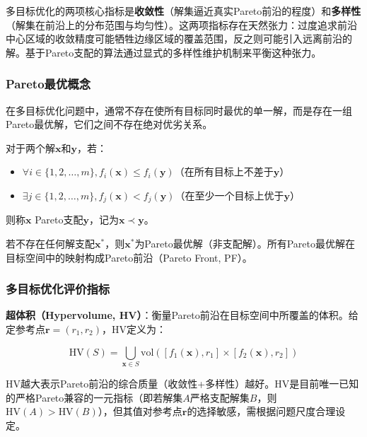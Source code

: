 多目标优化的两项核心指标是\textbf{收敛性}（解集逼近真实Pareto前沿的程度）和\textbf{多样性}（解集在前沿上的分布范围与均匀性）。这两项指标存在天然张力：过度追求前沿中心区域的收敛精度可能牺牲边缘区域的覆盖范围，反之则可能引入远离前沿的解。基于Pareto支配的算法通过显式的多样性维护机制来平衡这种张力。

\subsubsection{Pareto最优概念}

在多目标优化问题中，通常不存在使所有目标同时最优的单一解，而是存在一组Pareto最优解，它们之间不存在绝对优劣关系。

\begin{definition}[Pareto支配]
对于两个解$\mathbf{x}$和$\mathbf{y}$，若：
\begin{itemize}
    \item $\forall i \in \{1,2,\ldots,m\}, f_i(\mathbf{x}) \leq f_i(\mathbf{y})$（在所有目标上不差于$\mathbf{y}$）
    \item $\exists j \in \{1,2,\ldots,m\}, f_j(\mathbf{x}) < f_j(\mathbf{y})$（在至少一个目标上优于$\mathbf{y}$）
\end{itemize}
则称$\mathbf{x}$ Pareto支配$\mathbf{y}$，记为$\mathbf{x} \prec \mathbf{y}$。
\end{definition}

\begin{definition}[Pareto最优解]
若不存在任何解支配$\mathbf{x}^*$，则$\mathbf{x}^*$为Pareto最优解（非支配解）。所有Pareto最优解在目标空间中的映射构成Pareto前沿（Pareto Front, PF）。
\end{definition}

\subsubsection{多目标优化评价指标}

\textbf{超体积（Hypervolume, HV）}：衡量Pareto前沿在目标空间中所覆盖的体积。给定参考点$\mathbf{r} = (r_1, r_2)$，HV定义为：

\begin{equation}
\text{HV}(S) = \bigcup_{\mathbf{x} \in S} \text{vol}\left([f_1(\mathbf{x}), r_1] \times [f_2(\mathbf{x}), r_2]\right)
\label{eq:hv}
\end{equation}

HV越大表示Pareto前沿的综合质量（收敛性+多样性）越好。HV是目前唯一已知的严格Pareto兼容的一元指标\cite{Zitzler2001}（即若解集$A$严格支配解集$B$，则$\text{HV}(A) > \text{HV}(B)$），但其值对参考点$\mathbf{r}$的选择敏感，需根据问题尺度合理设定。

